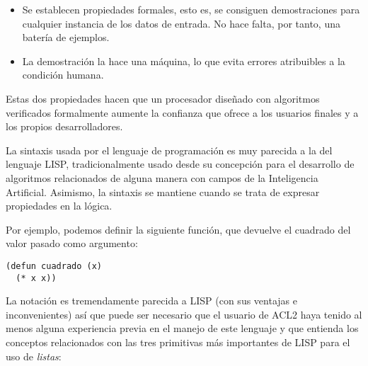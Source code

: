 \documentclass[a4paper,10pt]{article}
\begin{document}
\par\vspace{10pt}

\begin{itemize}
	\item Se establecen propiedades formales, esto es, se consiguen demostraciones para cualquier instancia de los datos de entrada. No hace falta, por tanto, una batería de ejemplos.
	\item La demostración la hace una máquina, lo que evita errores atribuibles a la condición humana.
\end{itemize}

\par\vspace{10pt}

Estas dos propiedades hacen que un procesador diseñado con algoritmos verificados formalmente aumente la confianza que ofrece a los usuarios finales y a los propios desarrolladores. 

\par\vspace{10pt}

La sintaxis usada por el lenguaje de programación es muy parecida a la del lenguaje LISP, tradicionalmente usado desde su concepción para el desarrollo de algoritmos relacionados de alguna manera con campos de la Inteligencia Artificial. Asimismo, la sintaxis se mantiene cuando se trata de expresar propiedades en la lógica.

\par\vspace{10pt}

Por ejemplo, podemos definir la siguiente función, que devuelve el cuadrado del valor pasado como argumento:

\par\vspace{10pt}

\begin{lstlisting}[language=clips]
(defun cuadrado (x)
  (* x x))
\end{lstlisting}

\par\vspace{10pt}

La notación es tremendamente parecida a LISP (con sus ventajas e inconvenientes) así que puede ser necesario que el usuario de ACL2 haya tenido al menos alguna experiencia previa en el manejo de este lenguaje y que entienda los conceptos relacionados con las tres primitivas más importantes de LISP para el uso de \emph{listas}:
\end{document}
